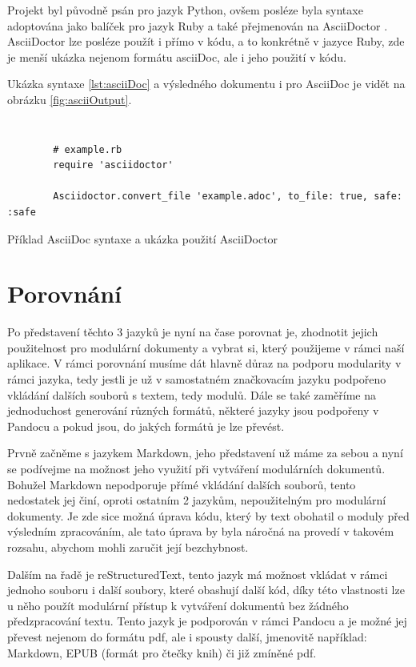Projekt byl původně psán pro jazyk Python, ovšem posléze byla syntaxe adoptována jako balíček pro jazyk Ruby a také přejmenován na AsciiDoctor \cite{asciiDoctorSW}. AsciiDoctor lze posléze
použít i přímo v kódu, a to konkrétně v jazyce Ruby, zde je menší ukázka nejenom formátu asciiDoc, ale i jeho použití v kódu.

Ukázka syntaxe \ref{lst:asciiDoc} a výsledného dokumentu i pro AsciiDoc je vidět na obrázku \ref{fig:asciiOutput}.

\begin{listing}[ht]
    \inputminted[linenos,breaklines]{text}{example-ascii.adoc}
    \inputminted[linenos,breaklines]{text}{module.adoc}
    \begin{verbatim}
        # example.rb
        require 'asciidoctor'

        Asciidoctor.convert_file 'example.adoc', to_file: true, safe: :safe
    \end{verbatim}
    \caption{Příklad AsciiDoc syntaxe a ukázka použití AsciiDoctor}
    \label{lst:asciiDoc}
\end{listing}

\clearpage

\section{Porovnání}

Po představení těchto 3 jazyků je nyní na čase porovnat je, zhodnotit jejich použitelnost pro modulární dokumenty a vybrat si, který použijeme v rámci naší aplikace.
V rámci porovnání musíme dát hlavně důraz na podporu modularity v rámci jazyka, tedy jestli je už v samostatném značkovacím jazyku podpořeno vkládání dalších
souborů s textem, tedy modulů. Dále se také zaměříme na jednoduchost generování různých formátů, některé jazyky jsou podpořeny v Pandocu a pokud jsou, do jakých
formátů je lze převést.

Prvně začněme s jazykem Markdown, jeho představení už máme za sebou a nyní se podívejme na možnost jeho využití při vytváření modulárních dokumentů. Bohužel
Markdown nepodporuje přímé vkládání dalších souborů, tento nedostatek jej činí, oproti ostatním 2 jazykům, nepoužitelným pro modulární dokumenty. Je zde sice možná úprava
kódu, který by text obohatil o moduly před výsledním zpracováním, ale tato úprava by byla náročná na provedí v takovém rozsahu, abychom mohli zaručit její bezchybnost.

Dalším na řadě je reStructuredText, tento jazyk má možnost vkládat v rámci jednoho souboru i další soubory, které obashují další kód, díky této vlastnosti
lze u něho použít modulární přístup k vytváření dokumentů bez žádného předzpracování textu. Tento jazyk je podporován v rámci Pandocu \cite{pandocSW} a je možné
jej převest nejenom do formátu \gls{pdf}, ale i spousty další, jmenovitě například: Markdown, EPUB (formát pro čtečky knih) či již zmíněné \gls{pdf}.

